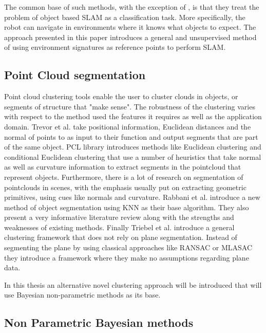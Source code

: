 \documentclass [twoside,hidelinks]{article}
\begin{document}
The common base of such methods, with the exception of \cite{objectDisc}, is that they treat the problem of object based SLAM as a classification task. More specifically, the robot can navigate in environments where it knows what objects to expect.
The approach presented in this paper introduces a general and unsupervised method of using environment signatures as reference points to perform SLAM.

\subsection{Point Cloud segmentation}

Point cloud clustering tools enable the user to cluster clouds in objects, or segments of structure that "make sense". The robustness of the clustering varies with respect to the method used the features it requires as well as the application domain.
Trevor et al.\cite{pointSeg} take positional information, Euclidean distances and the normal of points to as input to their function and output segments that are part of the same object. PCL library\cite{pcl} introduces methods like Euclidean clustering and conditional Euclidean clustering that use a number of heuristics that take normal as well as curvature information to extract segments in the pointcloud that represent objects. Furthermore, there is a lot of research on segmentation of pointclouds in scenes, with the emphasis usually put on extracting geometric primitives\cite{planarSeg},\cite{planarSeg2} using cues like normals and curvature. Rabbani et al.\cite{segOverview} introduce a new method of object segmentation using KNN as their base algorithm. They also present a very informative literature review along with the strengths and weaknesses of existing methods. Finally Triebel et al.\cite{smartSeg} introduce a general clustering framework that does not rely on plane segmentation. Instead of segmenting the plane by using classical approaches like RANSAC or MLASAC they introduce a framework where they make no assumptions regarding plane data. 
 
In this thesis an alternative novel clustering approach will be introduced that will use Bayesian non-parametric methods as its base.

\subsection{Non Parametric Bayesian methods}
\end{document}
